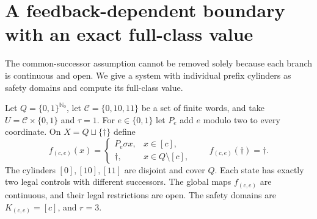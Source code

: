 \documentclass[11pt,reqno]{amsart}
\numberwithin{equation}{section}
\theoremstyle{definition}
\theoremstyle{remark}
\newcommand{\Nzero}{\mathbb N_0}
\begin{document}
\section{A feedback-dependent boundary with an exact full-class value}

The common-successor assumption cannot be removed solely because each
branch is continuous and open. We give a system with individual
prefix cylinders as safety domains and compute its full-class value.

Let $Q=\{0,1\}^{\Nzero}$, let $\mathcal C=\{0,10,11\}$ be a set of
finite words, and take $U=\mathcal C\times\{0,1\}$ and $\tau=1$.
For $e\in\{0,1\}$ let $P_e$ add $e$ modulo two to every coordinate.
On $X=Q\sqcup\{\dagger\}$ define
\begin{equation}\label{eq:boundarysystem}
 f_{(c,e)}(x)=
 \begin{cases}P_e\sigma x,&x\in[c],\\
 \dagger,&x\in Q\setminus[c],\end{cases}
 \qquad f_{(c,e)}(\dagger)=\dagger.
\end{equation}
The cylinders $[0],[10],[11]$ are disjoint and cover $Q$. Each state
has exactly two legal controls with different successors. The global
maps $f_{(c,e)}$ are continuous, and their legal restrictions are open.
The safety domains are $K_{(c,e)}=[c]$, and $r=3$.
\end{document}
